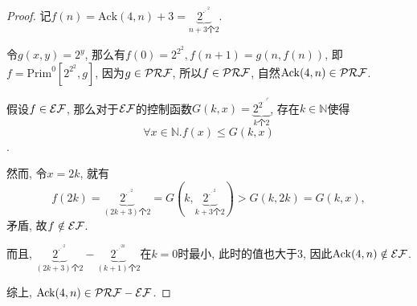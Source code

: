 \begin{proof}
    记$f(n)=\mathrm{Ack}(4,n)+3=\underbrace{2^{\cdot^{\cdot^{\cdot 2}}}}_{n+3\text{个}2}$.

    令$g(x,y)=2^y$, 那么有$f(0)=2^{2^2},f(n+1)=g(n,f(n))$, 即$f=\mathrm{Prim}^0[2^{2^2},g]$,
    因为$g\in\mathcal{PRF}$, 所以$f\in\mathcal{PRF}$, 自然$\mathrm{Ack}(4,n)\in\mathcal{PRF}$.

    假设$f\in\mathcal{EF}$, 那么对于$\mathcal{EF}$的控制函数$G(k,x)=\underbrace{2^{2^{\cdot^{\cdot^{\cdot 2^x}}}}}_{k\text{个}2}$, 存在$k\in\mathbb{N}$使得$$\forall x\in\mathbb{N}.f(x)\leqslant G(k,x)$$.

    然而, 令$x=2k$, 就有
    $$f(2k)=\underbrace{2^{\cdot^{\cdot^{\cdot 2}}}}_{(2k+3)\text{个}2}=G(k,\underbrace{2^{\cdot^{\cdot^{\cdot 2}}}}_{k+3\text{个}2})>G(k,2k)=G(k,x),$$
    矛盾, 故$f\notin\mathcal{EF}$.

    而且, $\underbrace{2^{\cdot^{\cdot^{\cdot 2}}}}_{(2k+3)\text{个}2}-\underbrace{2^{\cdot^{\cdot^{\cdot 2k}}}}_{(k+1)\text{个}2}$在$k=0$时最小, 此时的值也大于3, 因此$\mathrm{Ack}(4,n)\notin\mathcal{EF}$.

    综上, $\mathrm{Ack}(4,n)\in\mathcal{PRF}-\mathcal{EF}$.
\end{proof}